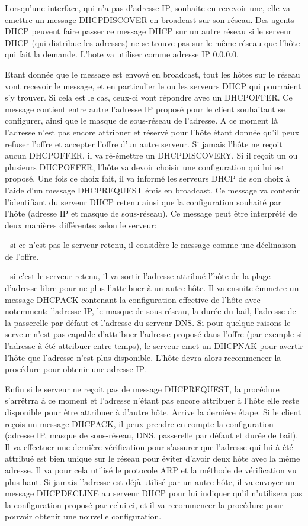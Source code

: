 Lorsqu'une interface, qui n'a pas d'adresse IP, souhaite en recevoir une, elle
va emettre un message DHCPDISCOVER en broadcast sur son réseau. Des agents DHCP
peuvent faire passer
ce message DHCP sur un autre réseau si le serveur DHCP (qui distribue les
adresses) ne se trouve pas sur le même réseau que l'hôte qui fait la demande.
L'hote va utiliser comme adresse IP 0.0.0.0.

Etant donnée que le message est envoyé en broadcast, tout les hôtes sur le
réseau vont recevoir le message, et en particulier le ou les serveurs DHCP qui
pourraient s'y trouver. Si cela est le cas, ceux-ci vont répondre avec un
DHCPOFFER. Ce message contient entre autre l'adresse IP proposé pour le client
souhaitant se configurer, ainsi que le masque de sous-réseau de l'adresse. A ce
moment là l'adresse n'est pas encore attribuer et réservé pour l'hôte étant
donnée qu'il peux refuser l'offre et accepter l'offre d'un autre serveur. Si
jamais l'hôte ne reçoit aucun DHCPOFFER, il va ré-émettre un DHCPDISCOVERY. Si
il reçoit un ou plusieurs DHCPOFFER, l'hôte va devoir choisir une configuration
qui lui est proposé. Une fois ce choix fait, il va informé les serveurs DHCP de
son choix à l'aide d'un message DHCPREQUEST émis en broadcast. Ce message va
contenir l'identifiant du serveur DHCP retenu ainsi que la configuration
souhaité par l'hôte (adresse IP et masque de sous-réseau). Ce message peut être
interprété de deux manières différentes selon le serveur:
\item- si ce n'est pas le serveur retenu, il considère le message comme une
déclinaison de l'offre.

\item- si c'est le serveur retenu, il va sortir l'adresse attribué l'hôte de la
plage d'adresse libre pour ne plus l'attribuer à un autre hôte. Il va ensuite
émmetre un message DHCPACK contenant la configuration effective de l'hôte avec
notemment: l'adresse IP, le masque de sous-réseau, la durée du bail, l'adresse
de la passerelle par défaut et l'adresse du serveur DNS.  Si pour quelque
raisons le serveur n'est pas capable d'attribuer l'adresse proposé dans l'offre
(par exemple si l'adresse à été attribuer entre temps), le serveur emet un
DHCPNAK pour avertir l'hôte que l'adresse n'est plus disponible. L'hôte devra
alors recommencer la procédure pour obtenir une adresse IP.

Enfin si le serveur ne reçoit pas de message DHCPREQUEST, la procédure
s'arrêtrra à ce moment et l'adresse n'étant pas encore attribuer à l'hôte elle
reste disponible pour être attribuer à d'autre hôte.  Arrive la dernière étape.
Si le client reçois un message DHCPACK, il peux prendre en compte la
configuration (adresse IP, masque de sous-réseau, DNS, passerelle par défaut et
durée de bail). Il va effectuer une dernière vérification pour s'assurer que
l'adresse qui lui à été attribué est bien unique sur le réseau pour éviter
d'avoir deux hôte avec la même adresse. Il va pour cela utilisé le protocole
ARP et la méthode de vérification vu plus haut. Si jamais l'adresse est déjà
utilisé par un autre hôte, il va envoyer un message DHCPDECLINE au serveur DHCP
pour lui indiquer qu'il n'utilisera pas la configuration proposé par celui-ci,
et il va recommencer la procédure pour pouvoir obtenir une nouvelle
configuration.

